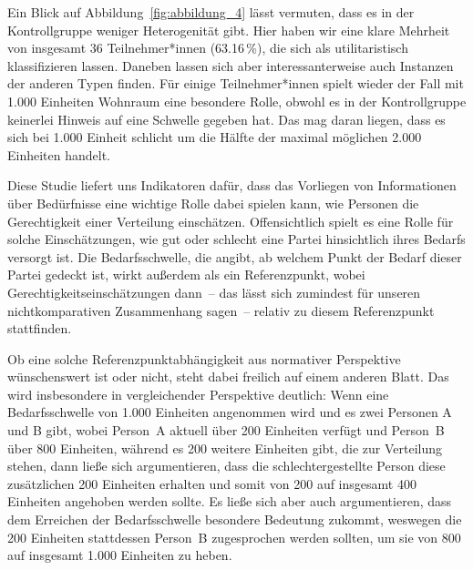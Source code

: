 \documentclass[justified,nobib,nohyper,symmetric,twoside]{tufte-book}
\begin{document}
Ein Blick auf Abbildung~\ref{fig:abbildung_4} lässt vermuten, dass es in der Kontrollgruppe weniger Heterogenität gibt.
Hier haben wir eine klare Mehrheit von insgesamt 36 Teilnehmer*innen (63.16\,\%), die sich als utilitaristisch klassifizieren lassen.
Daneben lassen sich aber interessanterweise auch Instanzen der anderen Typen finden.
Für einige Teilnehmer*innen spielt wieder der Fall mit 1.000 Einheiten Wohnraum eine besondere Rolle, obwohl es in der Kontrollgruppe keinerlei Hinweis auf eine Schwelle gegeben hat.
Das mag daran liegen, dass es sich bei 1.000 Einheit schlicht um die Hälfte der maximal möglichen 2.000 Einheiten handelt.

Diese Studie liefert uns Indikatoren dafür, dass das Vorliegen von Informationen über Bedürfnisse eine wichtige Rolle dabei spielen kann, wie Personen die Gerechtigkeit einer Verteilung einschätzen.
Offensichtlich spielt es eine Rolle für solche Einschätzungen, wie gut oder schlecht eine Partei hinsichtlich ihres Bedarfs versorgt ist.
Die Bedarfsschwelle, die angibt, ab welchem Punkt der Bedarf dieser Partei gedeckt ist, wirkt außerdem als ein Referenzpunkt, wobei Gerechtigkeitseinschätzungen dann~-- das lässt sich zumindest für unseren nichtkomparativen Zusammenhang sagen~-- relativ zu diesem Referenzpunkt stattfinden.

Ob eine solche Referenzpunktabhängigkeit aus normativer Perspektive wünschenswert ist oder nicht, steht dabei freilich auf einem anderen Blatt.
Das wird insbesondere in vergleichender Perspektive deutlich: Wenn eine Bedarfsschwelle von 1.000 Einheiten angenommen wird und es zwei Personen A und B gibt, wobei Person~A aktuell über 200 Einheiten verfügt und Person~B über 800 Einheiten, während es 200 weitere Einheiten gibt, die zur Verteilung stehen, dann ließe sich argumentieren, dass die schlechtergestellte Person diese zusätzlichen 200 Einheiten erhalten und somit von 200 auf insgesamt 400 Einheiten angehoben werden sollte.
Es ließe sich aber auch argumentieren, dass dem Erreichen der Bedarfsschwelle besondere Bedeutung zukommt, weswegen die 200 Einheiten stattdessen Person~B zugesprochen werden sollten, um sie von 800 auf insgesamt 1.000 Einheiten zu heben.


\end{document}
